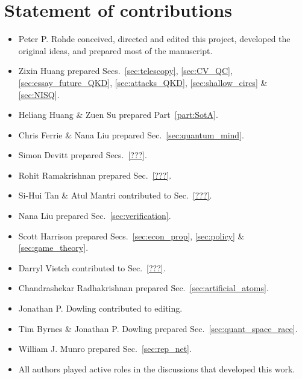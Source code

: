 %
%

\section*{Statement of contributions}

\begin{itemize}
	\item Peter P. Rohde conceived, directed and edited this project, developed the original ideas, and prepared most of the manuscript.
	\item Zixin Huang prepared Secs.~\ref{sec:telescopy}, \ref{sec:CV_QC}, \ref{sec:essay_future_QKD}, \ref{sec:attacks_QKD}, \ref{sec:shallow_circs} \& \ref{sec:NISQ}.
	\item Heliang Huang \& Zuen Su prepared Part~\ref{part:SotA}.
	\item Chris Ferrie \& Nana Liu prepared Sec.~\ref{sec:quantum_mind}.
	\item Simon Devitt prepared Secs.~\ref{???}.
	\item Rohit Ramakrishnan prepared Sec.~\ref{???}.
	\item Si-Hui Tan \& Atul Mantri contributed to Sec.~\ref{???}.
	\item Nana Liu prepared Sec.~\ref{sec:verification}.
	\item Scott Harrison prepared Secs.~\ref{sec:econ_prop}, \ref{sec:policy} \& \ref{sec:game_theory}.
	\item Darryl Vietch contributed to Sec.~\ref{???}.
	\item Chandrashekar Radhakrishnan prepared Sec.~\ref{sec:artificial_atoms}.
	\item Jonathan P. Dowling contributed to editing.
	\item Tim Byrnes \& Jonathan P. Dowling prepared Sec.~\ref{sec:quant_space_race}.
	\item William J. Munro prepared Sec.~\ref{sec:rep_net}. 
	\item All authors played active roles in the discussions that developed this work. 
\end{itemize}